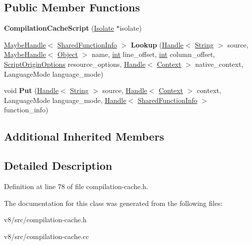 \subsection*{Public Member Functions}
\begin{DoxyCompactItemize}
\item 
\mbox{\label{classv8_1_1internal_1_1CompilationCacheScript_a879c8917896fa78e22c2459d28c8a9b8}} 
{\bfseries Compilation\+Cache\+Script} (\mbox{\hyperlink{classv8_1_1internal_1_1Isolate}{Isolate}} $\ast$isolate)
\item 
\mbox{\label{classv8_1_1internal_1_1CompilationCacheScript_a589bb3b6be74253e117da9557e8d598b}} 
\mbox{\hyperlink{classv8_1_1internal_1_1MaybeHandle}{Maybe\+Handle}}$<$ \mbox{\hyperlink{classv8_1_1internal_1_1SharedFunctionInfo}{Shared\+Function\+Info}} $>$ {\bfseries Lookup} (\mbox{\hyperlink{classv8_1_1internal_1_1Handle}{Handle}}$<$ \mbox{\hyperlink{classv8_1_1internal_1_1String}{String}} $>$ source, \mbox{\hyperlink{classv8_1_1internal_1_1MaybeHandle}{Maybe\+Handle}}$<$ \mbox{\hyperlink{classv8_1_1internal_1_1Object}{Object}} $>$ name, \mbox{\hyperlink{classint}{int}} line\+\_\+offset, \mbox{\hyperlink{classint}{int}} column\+\_\+offset, \mbox{\hyperlink{classv8_1_1ScriptOriginOptions}{Script\+Origin\+Options}} resource\+\_\+options, \mbox{\hyperlink{classv8_1_1internal_1_1Handle}{Handle}}$<$ \mbox{\hyperlink{classv8_1_1internal_1_1Context}{Context}} $>$ native\+\_\+context, Language\+Mode language\+\_\+mode)
\item 
\mbox{\label{classv8_1_1internal_1_1CompilationCacheScript_a155cf678b66e0c7cc3c2fda958982e03}} 
void {\bfseries Put} (\mbox{\hyperlink{classv8_1_1internal_1_1Handle}{Handle}}$<$ \mbox{\hyperlink{classv8_1_1internal_1_1String}{String}} $>$ source, \mbox{\hyperlink{classv8_1_1internal_1_1Handle}{Handle}}$<$ \mbox{\hyperlink{classv8_1_1internal_1_1Context}{Context}} $>$ context, Language\+Mode language\+\_\+mode, \mbox{\hyperlink{classv8_1_1internal_1_1Handle}{Handle}}$<$ \mbox{\hyperlink{classv8_1_1internal_1_1SharedFunctionInfo}{Shared\+Function\+Info}} $>$ function\+\_\+info)
\end{DoxyCompactItemize}
\subsection*{Additional Inherited Members}


\subsection{Detailed Description}


Definition at line 78 of file compilation-\/cache.\+h.



The documentation for this class was generated from the following files\+:\begin{DoxyCompactItemize}
\item 
v8/src/compilation-\/cache.\+h\item 
v8/src/compilation-\/cache.\+cc\end{DoxyCompactItemize}
